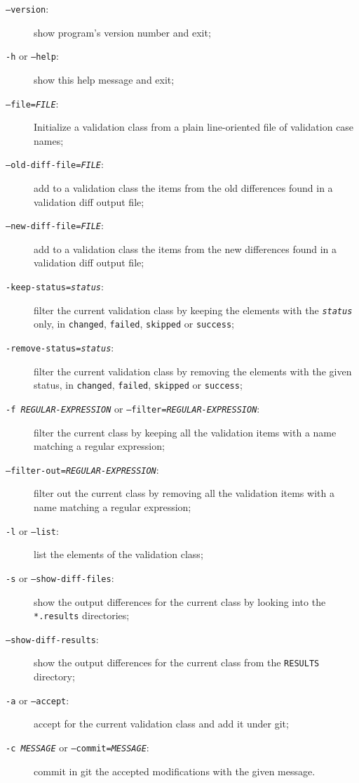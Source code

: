 \documentclass[a4paper]{article}
\begin{document}
\begin{description}
\item[\texttt{--version}:] show program's version number and exit;

\item[\texttt{-h} or \texttt{--help}:] show this help message and exit;

\item[\texttt{--file=\emph{FILE}}:] Initialize a validation class from a plain
  line-oriented file of validation case names;

\item[\texttt{--old-diff-file=\emph{FILE}}:] add to a validation class the
  items from the old differences found in a validation diff output file;

\item[\texttt{--new-diff-file=\emph{FILE}}:] add to a validation class the
  items from the new differences found in a validation diff output file;

\item[\texttt{-keep-status=\emph{status}}:] filter the current validation
  class by keeping the elements with the \texttt{\emph{status}} only, in
  \texttt{changed}, \texttt{failed}, \texttt{skipped} or \texttt{success};

\item[\texttt{-remove-status=\emph{status}}:] filter the current
  validation class by removing the elements with the given status, in
  \texttt{changed}, \texttt{failed}, \texttt{skipped} or \texttt{success};

\item[\texttt{-f \emph{REGULAR-EXPRESSION}} or
  \texttt{--filter=\emph{REGULAR-EXPRESSION}}:] filter the current class
  by keeping all the validation items with a name matching a regular
  expression;

\item[\texttt{--filter-out=\emph{REGULAR-EXPRESSION}}:] filter out the
  current class by removing all the validation items with a name matching
  a regular expression;

\item[\texttt{-l} or \texttt{--list}:] list the elements of the validation
  class;

\item[\texttt{-s} or \texttt{--show-diff-files}:] show the output
  differences for the current class by looking into the \texttt{*.results}
  directories;
\item[\texttt{--show-diff-results}:] show the output differences for the
  current class from the \texttt{RESULTS} directory;

\item[\texttt{-a} or \texttt{--accept}:] accept for the current validation
  class and add it under git;

\item[\texttt{-c \emph{MESSAGE}} or \texttt{--commit=\emph{MESSAGE}}:]
  commit in git the accepted modifications with the given message.
\end{description}
\end{document}

